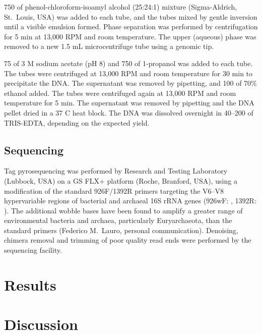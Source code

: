 750 \microlitre{} of phenol-chloroform-isoamyl alcohol (25:24:1) mixture (Sigma-Aldrich, St.\ Louis, USA) was added to each tube, and the tubes mixed by gentle inversion until a visible emulsion formed.
Phase separation was performed by centrifugation for 5 min at 13,000 RPM and room temperature.
The upper (aqueous) phase was removed to a new 1.5 mL microcentrifuge tube using a genomic tip.

75 \microlitre{} of 3 M sodium acetate (pH 8) and 750 \microlitre{} of 1-propanol was added to each tube.
The tubes were centrifuged at 13,000 RPM and room temperature for 30 min to precipitate the DNA.
The supernatant was removed by pipetting, and 100 \microlitre{} of 70\% ethanol added.
The tubes were centrifuged again at 13,000 RPM and room temperature for 5 min.
The supernatant was removed by pipetting and the DNA pellet dried in a 37 \textdegree{}C heat block.
The DNA was dissolved overnight in 40--200 \microlitre{} of TRIS-EDTA, depending on the expected yield.

\subsection{Sequencing}

Tag pyrosequencing was performed by Research and Testing Laboratory (Lubbock, USA) on a GS FLX+ platform (Roche, Branford, USA), using a modification of the standard 926F/1392R primers targeting the V6--V8 hypervariable regions of bacterial and archaeal 16S rRNA genes (926wF: , 1392R: ).
The additional wobble bases have been found to amplify a greater range of environmental bacteria and archaea, particularly Euryarchaeota, than the standard primers (Federico M.\ Lauro, personal communication).
Denoising, chimera removal and trimming of poor quality read ends were performed by the sequencing facility.

\section{Results}

\section{Discussion}

